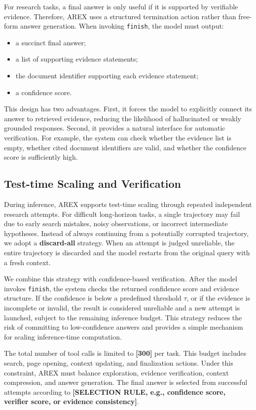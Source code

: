 \documentclass[]{selfevolagent}
\theoremstyle{plain}
\theoremstyle{definition}
\theoremstyle{remark}
\begin{document}
For research tasks, a final answer is only useful if it is supported by verifiable evidence. Therefore, \textsc{AREX} uses a structured termination action rather than free-form answer generation. When invoking \texttt{finish}, the model must output:
\begin{itemize}
\item a succinct final answer;
\item a list of supporting evidence statements;
\item the document identifier supporting each evidence statement;
\item a confidence score.
\end{itemize}

This design has two advantages. First, it forces the model to explicitly connect its answer to retrieved evidence, reducing the likelihood of hallucinated or weakly grounded responses. Second, it provides a natural interface for automatic verification. For example, the system can check whether the evidence list is empty, whether cited document identifiers are valid, and whether the confidence score is sufficiently high.

\subsection{Test-time Scaling and Verification}

During inference, \textsc{AREX} supports test-time scaling through repeated independent research attempts. For difficult long-horizon tasks, a single trajectory may fail due to early search mistakes, noisy observations, or incorrect intermediate hypotheses. Instead of always continuing from a potentially corrupted trajectory, we adopt a \textbf{discard-all} strategy. When an attempt is judged unreliable, the entire trajectory is discarded and the model restarts from the original query with a fresh context.

We combine this strategy with confidence-based verification. After the model invokes \texttt{finish}, the system checks the returned confidence score and evidence structure. If the confidence is below a predefined threshold $\tau$, or if the evidence is incomplete or invalid, the result is considered unreliable and a new attempt is launched, subject to the remaining inference budget. This strategy reduces the risk of committing to low-confidence answers and provides a simple mechanism for scaling inference-time computation.

The total number of tool calls is limited to \textbf{[300]} per task. This budget includes search, page opening, context updating, and finalization actions. Under this constraint, \textsc{AREX} must balance exploration, evidence verification, context compression, and answer generation. The final answer is selected from successful attempts according to \textbf{[SELECTION RULE, e.g., confidence score, verifier score, or evidence consistency]}.
\end{document}
